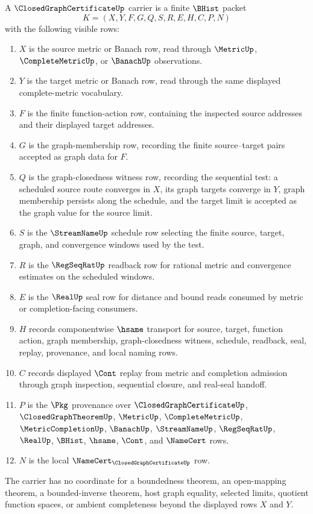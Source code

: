 \begin{definition}
\label{def:closed-graph-certificate-carrier}
A $\ClosedGraphCertificateUp$ carrier is a finite $\BHist$ packet
$$
K=(X,Y,F,G,Q,S,R,E,H,C,P,N)
$$
with the following visible rows:
\begin{enumerate}
\item $X$ is the source metric or Banach row, read through $\MetricUp$, $\CompleteMetricUp$, or $\BanachUp$ observations.
\item $Y$ is the target metric or Banach row, read through the same displayed complete-metric vocabulary.
\item $F$ is the finite function-action row, containing the inspected source addresses and their displayed target addresses.
\item $G$ is the graph-membership row, recording the finite source--target pairs accepted as graph data for $F$.
\item $Q$ is the graph-closedness witness row, recording the sequential test: a scheduled source route converges in $X$, its graph targets converge in $Y$, graph membership persists along the schedule, and the target limit is accepted as the graph value for the source limit.
\item $S$ is the $\StreamNameUp$ schedule row selecting the finite source, target, graph, and convergence windows used by the test.
\item $R$ is the $\RegSeqRatUp$ readback row for rational metric and convergence estimates on the scheduled windows.
\item $E$ is the $\RealUp$ seal row for distance and bound reads consumed by metric or completion-facing consumers.
\item $H$ records componentwise $\hsame$ transport for source, target, function action, graph membership, graph-closedness witness, schedule, readback, seal, replay, provenance, and local naming rows.
\item $C$ records displayed $\Cont$ replay from metric and completion admission through graph inspection, sequential closure, and real-seal handoff.
\item $P$ is the $\Pkg$ provenance over $\ClosedGraphCertificateUp$, $\ClosedGraphTheoremUp$, $\MetricUp$, $\CompleteMetricUp$, $\MetricCompletionUp$, $\BanachUp$, $\StreamNameUp$, $\RegSeqRatUp$, $\RealUp$, $\BHist$, $\hsame$, $\Cont$, and $\NameCert$ rows.
\item $N$ is the local $\NameCert_{\ClosedGraphCertificateUp}$ row.
\end{enumerate}
The carrier has no coordinate for a boundedness theorem, an open-mapping theorem, a bounded-inverse theorem, host graph equality, selected limits, quotient function spaces, or ambient completeness beyond the displayed rows $X$ and $Y$.
\end{definition}

